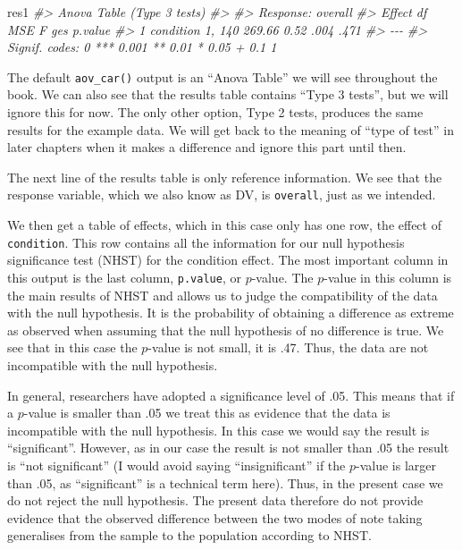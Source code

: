 \documentclass[
]{book}
\newenvironment{Shaded}{\begin{snugshade}}{\end{snugshade}}
\newcommand{\CommentTok}[1]{\textcolor[rgb]{0.56,0.35,0.01}{\textit{#1}}}
\newcommand{\NormalTok}[1]{#1}
\begin{document}
\begin{Shaded}
\begin{Highlighting}[]
\NormalTok{res1}
\CommentTok{\#\textgreater{} Anova Table (Type 3 tests)}
\CommentTok{\#\textgreater{} }
\CommentTok{\#\textgreater{} Response: overall}
\CommentTok{\#\textgreater{}      Effect     df    MSE    F  ges p.value}
\CommentTok{\#\textgreater{} 1 condition 1, 140 269.66 0.52 .004    .471}
\CommentTok{\#\textgreater{} {-}{-}{-}}
\CommentTok{\#\textgreater{} Signif. codes:  0 \textquotesingle{}***\textquotesingle{} 0.001 \textquotesingle{}**\textquotesingle{} 0.01 \textquotesingle{}*\textquotesingle{} 0.05 \textquotesingle{}+\textquotesingle{} 0.1 \textquotesingle{} \textquotesingle{} 1}
\end{Highlighting}
\end{Shaded}

The default \texttt{aov\_car()} output is an ``Anova Table'' we will see throughout the book. We can also see that the results table contains ``Type 3 tests'', but we will ignore this for now. The only other option, Type 2 tests, produces the same results for the example data. We will get back to the meaning of ``type of test'' in later chapters when it makes a difference and ignore this part until then.

The next line of the results table is only reference information. We see that the response variable, which we also know as DV, is \texttt{overall}, just as we intended.

We then get a table of effects, which in this case only has one row, the effect of \texttt{condition}. This row contains all the information for our null hypothesis significance test (NHST) for the condition effect. The most important column in this output is the last column, \texttt{p.value}, or \(p\)-value. The \(p\)-value in this column is the main results of NHST and allows us to judge the compatibility of the data with the null hypothesis. It is the probability of obtaining a difference as extreme as observed when assuming that the null hypothesis of no difference is true. We see that in this case the \(p\)-value is not small, it is .47. Thus, the data are not incompatible with the null hypothesis.

In general, researchers have adopted a significance level of .05. This means that if a \(p\)-value is smaller than .05 we treat this as evidence that the data is incompatible with the null hypothesis. In this case we would say the result is ``significant''. However, as in our case the result is not smaller than .05 the result is ``not significant'' (I would avoid saying ``insignificant'' if the \(p\)-value is larger than .05, as ``significant'' is a technical term here). Thus, in the present case we do not reject the null hypothesis. The present data therefore do not provide evidence that the observed difference between the two modes of note taking generalises from the sample to the population according to NHST.
\end{document}
